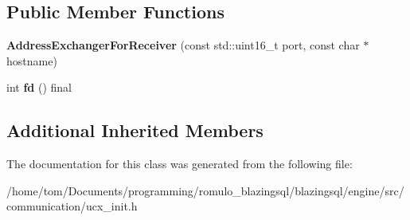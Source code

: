 \subsection*{Public Member Functions}
\begin{DoxyCompactItemize}
\item 
\mbox{\label{classral_1_1communication_1_1AddressExchangerForReceiver_a4ba4be272f1c323187b1f4db91d08978}} 
{\bfseries Address\+Exchanger\+For\+Receiver} (const std\+::uint16\+\_\+t port, const char $\ast$hostname)
\item 
\mbox{\label{classral_1_1communication_1_1AddressExchangerForReceiver_ac1b9066fdc95871b783dfae3c742df82}} 
int {\bfseries fd} () final
\end{DoxyCompactItemize}
\subsection*{Additional Inherited Members}


The documentation for this class was generated from the following file\+:\begin{DoxyCompactItemize}
\item 
/home/tom/\+Documents/programming/romulo\+\_\+blazingsql/blazingsql/engine/src/communication/ucx\+\_\+init.\+h\end{DoxyCompactItemize}
